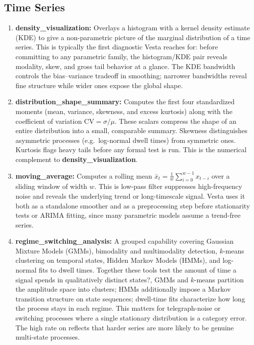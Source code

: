 \documentclass{article}
\newcommand{\method}{{\sc Vesta}}
\newcommand{\splitlabel}[3]{%
  \tikz[baseline=-0.6ex]{%
    \node[
      rounded corners=3pt,
      fill=#2,
      draw=#1,
      line width=0.8pt,
      inner xsep=4pt,
      inner ysep=2pt,
      font=\bfseries\small
    ] {#3};%
  }%
}
\newcommand{\Hard}{\splitlabel{hardred}{hardfill}{Hard}}
\begin{document}
\subsection{Time Series}
\begin{enumerate}

    \item \textbf{density\_visualization:} Overlays a histogram with a kernel density estimate (KDE) to give a non-parametric picture of the marginal distribution of a time series. This is typically the first diagnostic \method{} reaches for: before committing to any parametric family, the histogram/KDE pair reveals modality, skew, and gross tail behavior at a glance. The KDE bandwidth controls the bias--variance tradeoff in smoothing; narrower bandwidths reveal fine structure while wider ones expose the global shape.

    \item \textbf{distribution\_shape\_summary:} Computes the first four standardized moments (mean, variance, skewness, and excess kurtosis) along with the coefficient of variation $\text{CV} = \sigma/\mu$. These scalars compress the shape of an entire distribution into a small, comparable summary. Skewness distinguishes asymmetric processes (e.g.\ log-normal dwell times) from symmetric ones. Kurtosis flags heavy tails before any formal test is run. This is the numerical complement to \textbf{density\_visualization}.

    \item \textbf{moving\_average:} Computes a rolling mean $\bar{x}_t = \frac{1}{w}\sum_{i=0}^{w-1} x_{t-i}$ over a sliding window of width $w$. This is low-pass filter suppresses high-frequency noise and reveals the underlying trend or long-timescale signal. \method{} uses it both as a standalone smoother and as a preprocessing step before stationarity tests or ARIMA fitting, since many parametric models assume a trend-free series.

    \item \textbf{regime\_switching\_analysis:} A grouped capability covering Gaussian Mixture Models (GMMs), bimodality and multimodality detection, $k$-means clustering on temporal states, Hidden Markov Models (HMMs), and log-normal fits to dwell times. Together these tools test the amount of time a signal spends in qualitatively distinct states?, GMMs and $k$-means partition the amplitude space into clusters; HMMs additionally impose a Markov transition structure on state sequences; dwell-time fits characterize how long the process stays in each regime. This matters for telegraph-noise or switching processes where a single stationary distribution is a category error. The high rate on \protect\Hard{} reflects that harder series are more likely to be genuine multi-state processes.


\end{enumerate}
\end{document}
